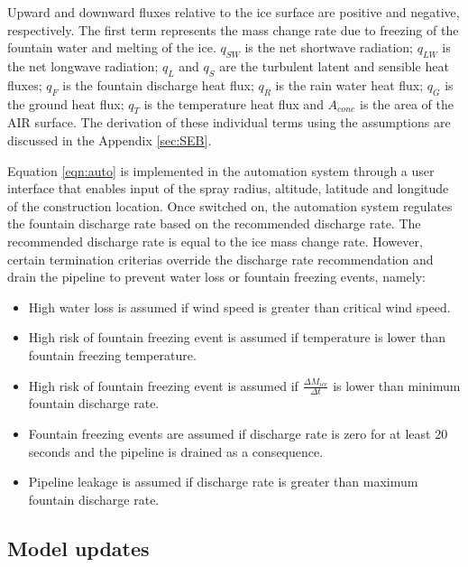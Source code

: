 \documentclass[tc, manuscript]{copernicus}
\begin{document}
Upward and downward fluxes relative to the ice surface are positive and negative, respectively. The first term
represents the mass change rate due to freezing of the fountain water and melting of the ice. $q_{SW}$ is the
net shortwave radiation; $q_{LW}$ is the net longwave radiation; $q_{L}$ and $q_{S}$ are the turbulent latent
and sensible heat fluxes; $q_{F}$ is the fountain discharge heat flux; $q_{R}$ is the rain water heat
flux; $q_{G}$ is the ground heat flux; $q_{T}$ is the temperature heat flux and $A_{cone}$ is the area of the
AIR surface. The derivation of these individual terms using the assumptions are discussed in the Appendix
\ref{sec:SEB}.

Equation \ref{eqn:auto} is implemented in the automation system through a user interface that enables input of
the spray radius, altitude, latitude and longitude of the construction location. Once switched on, the
automation system regulates the fountain discharge rate based on the recommended discharge rate. The recommended
discharge rate is equal to the ice mass change rate. However, certain termination criterias override the
discharge rate recommendation and drain the pipeline to prevent water loss or fountain freezing events, namely: 

\begin{itemize}

\item High water loss is assumed if wind speed is greater than critical wind speed.

\item High risk of fountain freezing event is assumed if temperature is lower than fountain freezing temperature.

\item High risk of fountain freezing event is assumed if $\frac{\Delta M_{ice}}{\Delta t}$ is lower than minimum fountain discharge rate. 

\item Fountain freezing events are assumed if discharge rate is zero for at least 20 seconds and the pipeline is drained as a
  consequence.

\item Pipeline leakage is assumed if discharge rate is greater than maximum fountain discharge rate.

\end{itemize}

\subsection{Model updates}
\end{document}
